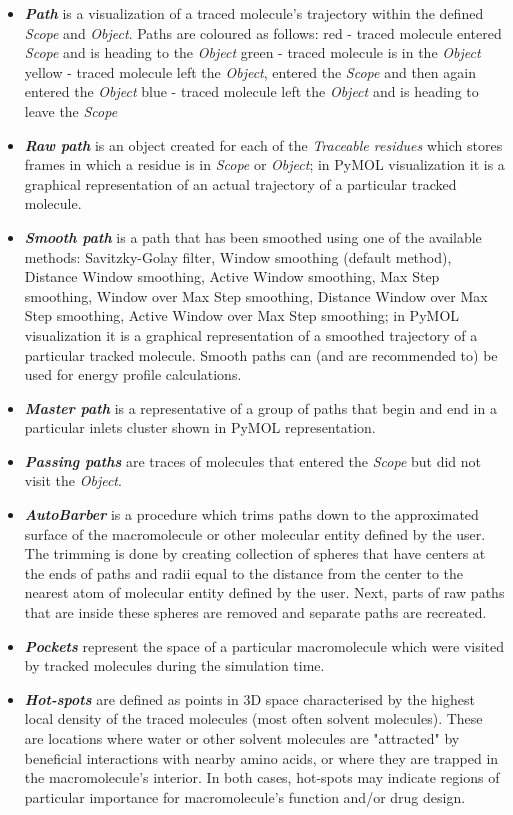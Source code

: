 \documentclass[9pt,tutorial]{livecoms}
\begin{document}
\begin{itemize}
\item \textbf{\textit{Path}} is a visualization of a traced molecule's trajectory within the defined \textit{Scope} and \textit{Object}. Paths are coloured as follows:
red - traced molecule entered \textit{Scope} and is heading to the \textit{Object}
green - traced molecule is in the \textit{Object}
yellow - traced molecule left the \textit{Object}, entered the \textit{Scope} and then again entered the \textit{Object}
blue - traced molecule left the \textit{Object} and is heading to leave the \textit{Scope}
\item \textbf{\textit{Raw path}} is an object created for each of the \textit{Traceable residues} which stores frames in which a residue is in \textit{Scope} or \textit{Object}; in PyMOL visualization it is a graphical representation of an actual trajectory of a particular tracked molecule.
\item \textbf{\textit{Smooth path}} is a path that has been smoothed using one of the available methods: Savitzky-Golay filter, Window smoothing (default method), Distance Window smoothing, Active Window smoothing, Max Step smoothing, Window over Max Step smoothing, Distance Window over Max Step smoothing, Active Window over Max Step smoothing; in PyMOL visualization it is a graphical representation of a smoothed trajectory of a particular tracked molecule. Smooth paths can (and are recommended to) be used for energy profile calculations.
\item \textbf{\textit{Master path}} is a representative of a group of paths that begin and end in a particular inlets cluster shown in PyMOL representation. 
\item \textbf{\textit{Passing paths}} are traces of molecules that entered the \textit{Scope} but did not visit the \textit{Object}.
\item \textbf{\textit{AutoBarber}} is a procedure which trims paths down to the  approximated surface of the macromolecule or other molecular entity defined by the user. The trimming is done by creating collection of spheres that have centers at the ends of paths and radii equal to the distance from the center to the nearest atom of molecular entity defined by the user. Next, parts of raw paths that are inside these spheres are removed and separate paths are recreated.
\item \textbf{\textit{Pockets}} represent the space of a particular macromolecule which were visited by tracked molecules during the simulation time.
\item \textbf{\textit{Hot-spots}} are defined as points in 3D space characterised by the highest local density of the traced molecules (most often solvent molecules). These are locations where water or other solvent molecules are "attracted" by beneficial interactions with nearby amino acids, or where they are trapped in the macromolecule's interior. In both cases, hot-spots may indicate regions of particular importance for macromolecule's function and/or drug design.

\end{itemize}
\end{document}
